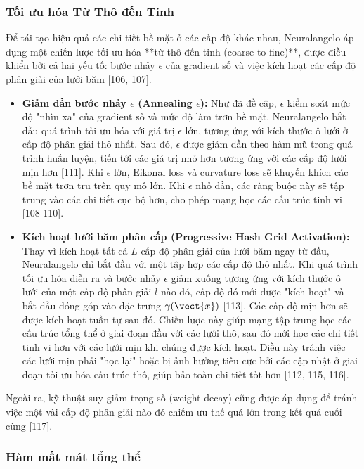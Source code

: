 \subsubsection{Tối ưu hóa Từ Thô đến Tinh}
\label{subsubsec:neuralangelo_coarse_to_fine}

Để tái tạo hiệu quả các chi tiết bề mặt ở các cấp độ khác nhau, Neuralangelo áp dụng một chiến lược tối ưu hóa **từ thô đến tinh (coarse-to-fine)**, được điều khiển bởi cả hai yếu tố: bước nhảy $\epsilon$ của gradient số và việc kích hoạt các cấp độ phân giải của lưới băm [106, 107].

\begin{itemize}
    \item \textbf{Giảm dần bước nhảy $\epsilon$ (Annealing $\epsilon$):} Như đã đề cập, $\epsilon$ kiểm soát mức độ "nhìn xa" của gradient số và mức độ làm trơn bề mặt. Neuralangelo bắt đầu quá trình tối ưu hóa với giá trị $\epsilon$ lớn, tương ứng với kích thước ô lưới ở cấp độ phân giải thô nhất. Sau đó, $\epsilon$ được giảm dần theo hàm mũ trong quá trình huấn luyện, tiến tới các giá trị nhỏ hơn tương ứng với các cấp độ lưới mịn hơn [111]. Khi $\epsilon$ lớn, Eikonal loss và curvature loss sẽ khuyến khích các bề mặt trơn tru trên quy mô lớn. Khi $\epsilon$ nhỏ dần, các ràng buộc này sẽ tập trung vào các chi tiết cục bộ hơn, cho phép mạng học các cấu trúc tinh vi [108-110].
    \item \textbf{Kích hoạt lưới băm phân cấp (Progressive Hash Grid Activation):} Thay vì kích hoạt tất cả $L$ cấp độ phân giải của lưới băm ngay từ đầu, Neuralangelo chỉ bắt đầu với một tập hợp các cấp độ thô nhất. Khi quá trình tối ưu hóa diễn ra và bước nhảy $\epsilon$ giảm xuống tương ứng với kích thước ô lưới của một cấp độ phân giải $l$ nào đó, cấp độ đó mới được "kích hoạt" và bắt đầu đóng góp vào đặc trưng $\gamma(\vect{x})$ [113]. Các cấp độ mịn hơn sẽ được kích hoạt tuần tự sau đó. Chiến lược này giúp mạng tập trung học các cấu trúc tổng thể ở giai đoạn đầu với các lưới thô, sau đó mới học các chi tiết tinh vi hơn với các lưới mịn khi chúng được kích hoạt. Điều này tránh việc các lưới mịn phải "học lại" hoặc bị ảnh hưởng tiêu cực bởi các cập nhật ở giai đoạn tối ưu hóa cấu trúc thô, giúp bảo toàn chi tiết tốt hơn [112, 115, 116].
\end{itemize}
Ngoài ra, kỹ thuật suy giảm trọng số (weight decay) cũng được áp dụng để tránh việc một vài cấp độ phân giải nào đó chiếm ưu thế quá lớn trong kết quả cuối cùng [117].

\subsubsection{Hàm mất mát tổng thể}
\label{subsubsec:neuralangelo_loss}

